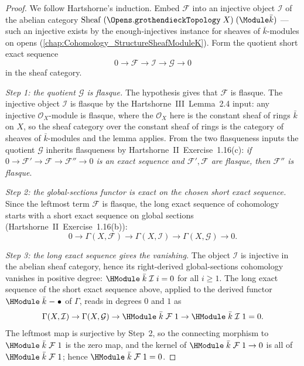 \begin{proof}
  \leanok
  We follow Hartshorne's induction. Embed \(\mathcal F\) into an
  injective object \(\mathcal I\) of the abelian category
  \(\mathrm{Sheaf}\;(\Opens.\mathtt{grothendieckTopology}\;X)\;
  (\Module \bar k)\) — such an injective exists by the
  enough-injectives instance for sheaves of \(\bar k\)-modules on opens
  (\cref{chap:Cohomology_StructureSheafModuleK}). Form the quotient
  short exact sequence
  \[
    0 \to \mathcal F \to \mathcal I \to \mathcal G \to 0
  \]
  in the sheaf category.

  \emph{Step 1: the quotient \(\mathcal G\) is flasque.} The hypothesis
  gives that \(\mathcal F\) is flasque. The injective object
  \(\mathcal I\) is flasque by the Hartshorne~III~Lemma~2.4 input:
  any injective \(\mathcal O_X\)-module is flasque, where the
  \(\mathcal O_X\) here is the constant sheaf of rings \(\bar k\) on
  \(X\), so the sheaf category over the constant sheaf of rings is the
  category of sheaves of \(\bar k\)-modules and the lemma applies. From
  the two flasqueness inputs the quotient \(\mathcal G\) inherits
  flasqueness by Hartshorne~II~Exercise~1.16(c): \emph{if
  \(0 \to \mathcal F' \to \mathcal F \to \mathcal F'' \to 0\) is an
  exact sequence and \(\mathcal F', \mathcal F\) are flasque, then
  \(\mathcal F''\) is flasque}.

  \emph{Step 2: the global-sections functor is exact on the chosen
  short exact sequence.} Since the leftmost term \(\mathcal F\) is
  flasque, the long exact sequence of cohomology starts with a short
  exact sequence on global sections
  (Hartshorne~II~Exercise~1.16(b)):
  \[
    0 \to \Gamma(X, \mathcal F) \to \Gamma(X, \mathcal I) \to
    \Gamma(X, \mathcal G) \to 0.
  \]

  \emph{Step 3: the long exact sequence gives the vanishing.}
  The object \(\mathcal I\) is injective in the abelian sheaf category,
  hence its right-derived global-sections cohomology vanishes in
  positive degree:
  \(\HModule\;\bar k\;\mathcal I\;i = 0\) for all \(i \ge 1\). The long
  exact sequence of the short exact sequence above, applied to the
  derived functor \(\HModule\;\bar k\;{-}\;{\bullet}\) of \(\Gamma\),
  reads in degrees \(0\) and \(1\) as
  \[
    \Gamma(X, \mathcal I) \to \Gamma(X, \mathcal G)
    \to \HModule\;\bar k\;\mathcal F\;1
    \to \HModule\;\bar k\;\mathcal I\;1 = 0.
  \]
  The leftmost map is surjective by Step~2, so the connecting morphism
  to \(\HModule\;\bar k\;\mathcal F\;1\) is the zero map, and the kernel
  of \(\HModule\;\bar k\;\mathcal F\;1 \to 0\) is all of
  \(\HModule\;\bar k\;\mathcal F\;1\); hence
  \(\HModule\;\bar k\;\mathcal F\;1 = 0\).


\end{proof}
